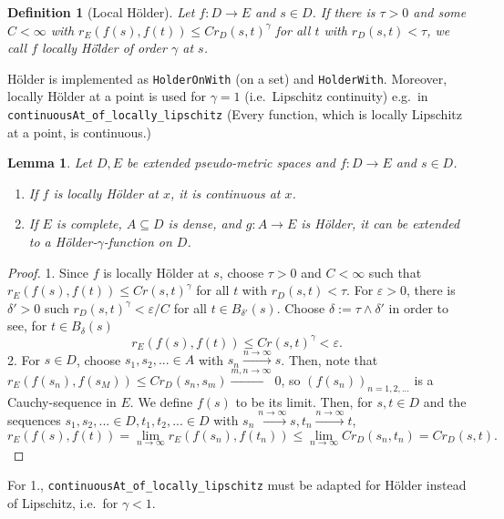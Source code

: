 \documentclass{article}
\newtheorem{lemma}[proposition]{Lemma}
\newtheorem{definition}[proposition]{Definition}
\theoremstyle{definition}
\theoremstyle{step} \newtheorem{step}{Step}
\newcommand{\leanline}[1]{\texttt{#1}}%
\begin{document}
\begin{definition}[Local Hölder]
  Let $f: D\to E$ and $s\in D$. If there is $\tau>0$ and some $C <
    \infty$ with $r_E(f(s), f(t)) \leq C r_D(s,t)^\gamma$ for all $t$
  with $r_D(s,t) < \tau$, we call $f$ \emph{locally Hö\"lder of order
    $\gamma$} at $s$.
\end{definition}

Hölder is implemented as \leanline{HolderOnWith} (on a set) and
\leanline{HolderWith}. Moreover, locally Hölder at a point is used for
$\gamma=1$ (i.e.\ Lipschitz continuity) e.g.\ in
\leanline{continuousAt_of_locally_lipschitz} (Every function, which is
locally Lipschitz at a point, is continuous.)

\begin{lemma}\label{l:holderext}
  Let $D, E$ be extended pseudo-metric spaces and $f: D\to E$ and
  $s\in D$.
  \begin{enumerate}
    \item If $f$ is locally Hölder at $x$, it is continuous at $x$.
    \item If $E$ is complete, $A \subseteq D$ is dense, and $g : A \to
            E$ is Hölder, it can be extended to a Hölder-$\gamma$-function
          on $D$.
  \end{enumerate}
\end{lemma}

\begin{proof}
  1. Since $f$ is locally Hölder at $s$, choose $\tau>0$ and
  $C<\infty$ such that $r_E(f(s), f(t)) \leq Cr(s,t)^\gamma$ for all
  $t$ with $r_D(s,t) < \tau$. For $\varepsilon>0$, there is
  $\delta'>0$ such $r_D(s,t)^\gamma < \varepsilon / C$ for all $t \in
    B_{\delta'}(s)$. Choose $\delta := \tau \wedge \delta'$ in order to
  see, for $t \in B_\delta(s)$
  $$ r_E(f(s), f(t)) \leq C r(s,t)^\gamma < \varepsilon.$$ 2. For $s
    \in D$, choose $s_1,s_2,...\in A$ with $s_n \xrightarrow{n\to\infty}
    s$. Then, note that $r_E(f(s_n), f(s_M)) \leq C r_D(s_n, s_m)
    \xrightarrow{m,n\to\infty} 0$, so $(f(s_n))_{n=1,2,...}$ is a
  Cauchy-sequence in $E$. We define $f(s)$ to be its limit. Then, for
  $s,t\in D$ and the sequences $s_1, s_2,...\in D, t_1, t_2,...\in D$
  with $s_n \xrightarrow{n\to\infty}s, t_n \xrightarrow{n\to\infty}t$,
  $$ r_E(f(s), f(t)) = \lim_{n\to\infty}r_E(f(s_n), f(t_n)) \leq
    \lim_{n\to\infty} Cr_D(s_n, t_n) = Cr_D(s,t).$$
\end{proof}

For 1., \leanline{continuousAt_of_locally_lipschitz} must be adapted
for Hölder instead of Lipschitz, i.e.\ for $\gamma<1$.
\end{document}
